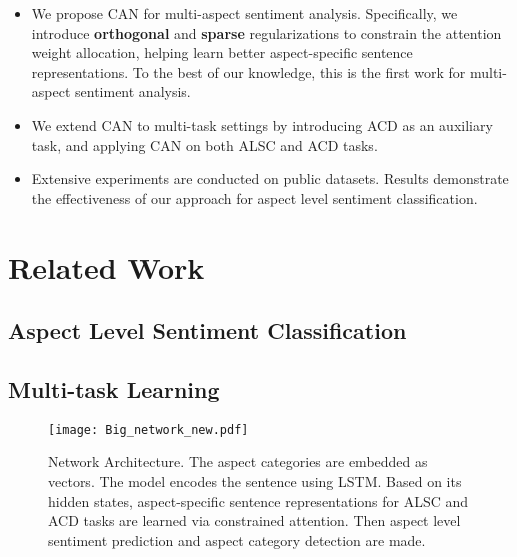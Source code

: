 \documentclass[11pt,a4paper]{article}
\begin{document}
\begin{itemize}
\vspace{-0.2cm}
\item We propose CAN for multi-aspect sentiment analysis. Specifically, we introduce {\bf orthogonal} and {\bf sparse} regularizations to constrain the attention weight allocation, helping learn better aspect-specific sentence representations. To the best of our knowledge, this is the first work for multi-aspect sentiment analysis.


\vspace{-0.2cm}
\item We extend CAN to multi-task settings by introducing ACD as an auxiliary task, and applying CAN on  both ALSC and ACD tasks. 

\vspace{-0.2cm}
\item Extensive experiments are conducted on public datasets. Results demonstrate the effectiveness of our approach for aspect level sentiment classification.  
\end{itemize}

\section{Related Work}

\subsection{Aspect Level Sentiment Classification}

\subsection{Multi-task Learning}


\begin{figure*}
\setlength{\abovecaptionskip}{0.2cm}   %
\setlength{\belowcaptionskip}{-0.3cm}   %
\centering
	\texttt{[image: Big\_network\_new.pdf]}
    \caption{Network Architecture. The aspect categories are embedded as vectors. The model encodes the sentence using LSTM. Based on its hidden states, aspect-specific sentence representations for ALSC and ACD tasks are learned via constrained attention. Then aspect level sentiment prediction and aspect category detection are made. }
    \label{network}
\end{figure*}
\end{document}
